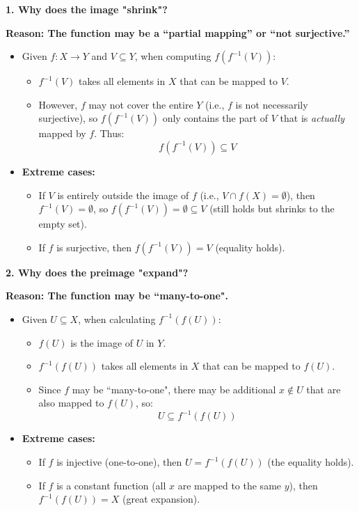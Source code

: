 \documentclass[../main.tex]{subfiles}
\begin{document}
\textbf{1. Why does the image "shrink"?}

\textbf{Reason: The function may be a ``partial mapping'' or ``not surjective.''}
\begin{itemize}
    \item Given $f: X \to Y$ and $V \subseteq Y$, when computing $f(f^{-1}(V))$:
    \begin{itemize}
        \item $f^{-1}(V)$ takes all elements in $X$ that can be mapped to $V$.
        \item However, $f$ may not cover the entire $Y$ (i.e., $f$ is not necessarily surjective), so $f(f^{-1}(V))$ only contains the part of $V$ that is \textit{actually} mapped by $f$. Thus:
        $$
            f(f^{-1}(V)) \subseteq V
        $$
    \end{itemize}
    \item \textbf{Extreme cases:}
    \begin{itemize}
        \item If $V$ is entirely outside the image of $f$ (i.e., $V \cap f(X) = \emptyset$), then $f^{-1}(V) = \emptyset$, so $f(f^{-1}(V)) = \emptyset \subseteq V$ (still holds but shrinks to the empty set).
        \item If $f$ is surjective, then $f(f^{-1}(V)) = V$ (equality holds).
    \end{itemize}
\end{itemize}

\textbf{2. Why does the preimage "expand"?}

\textbf{Reason: The function may be ``many-to-one".}
\begin{itemize}
    \item Given $U \subseteq X$, when calculating $f^{-1}(f(U))$:
    \begin{itemize}
        \item $f(U)$ is the image of $U$ in $Y$.
        \item $f^{-1}(f(U))$ takes all elements in $X$ that can be mapped to $f(U)$.
        \item Since $f$ may be ``many-to-one", there may be additional $x \notin U$ that are also mapped to $f(U)$, so:
        $$
            U \subseteq f^{-1}(f(U))
        $$
    \end{itemize}
    \item \textbf{Extreme cases:}
    \begin{itemize}
        \item If $f$ is injective (one-to-one), then $U = f^{-1}(f(U))$ (the equality holds).
        \item If $f$ is a constant function (all $x$ are mapped to the same $y$), then $f^{-1}(f(U)) = X$ (great expansion).
    \end{itemize}
\end{itemize}
\end{document}
